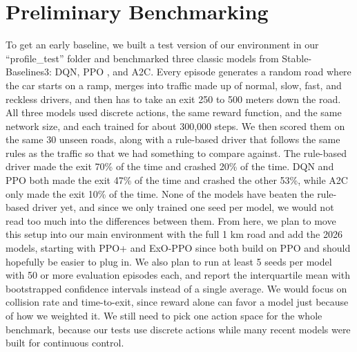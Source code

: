 \documentclass[conference]{IEEEtran}
\begin{document}
\section{Preliminary Benchmarking}
To get an early baseline, we built a test version of our environment in our ``profile\_test'' folder and
benchmarked three classic models from Stable-Baselines3: DQN, PPO \cite{b2}, and A2C. Every episode generates
a random road where the car starts on a ramp, merges into traffic made up of normal, slow, fast, and reckless
drivers, and then has to take an exit 250 to 500 meters down the road. All three models used discrete actions,
the same reward function, and the same network size, and each trained for about 300,000 steps. We then scored them
on the same 30 unseen roads, along with a rule-based driver that follows the same rules as the traffic so that we
had something to compare against. The rule-based driver made the exit 70\% of the time and crashed 20\% of the
time. DQN and PPO both made the exit 47\% of the time and crashed the other 53\%, while A2C only made the exit 10\%
of the time. None of the models have beaten the rule-based driver yet, and since we only trained one seed per model,
we would not read too much into the differences between them. From here, we plan to move this setup into our
main environment with the full 1 km road and add the 2026 models, starting with PPO+ \cite{b1} and ExO-PPO \cite{b5}
since both build on PPO and should hopefully be easier to plug in. We also plan to run at
least 5 seeds per model with 50 or more evaluation episodes each, and report the interquartile mean with bootstrapped
confidence intervals \cite{b13} instead of a single average. We would focus on collision rate and time-to-exit,
since reward alone can favor a model just because of how we weighted it. We still need to pick one action space for
the whole benchmark, because our tests use discrete actions while many recent models were built for continuous control.
\end{document}
